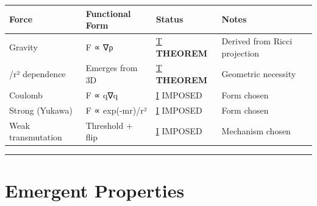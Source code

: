 \documentclass[
  11pt,
  letterpaper,
  twoside,
  openright]{book}
\begin{document}
\begin{longtable}[]{@{}
  >{\raggedright\arraybackslash}p{}
  >{\raggedright\arraybackslash}p{}
  >{\raggedright\arraybackslash}p{}
  >{\raggedright\arraybackslash}p{}@{}}
\toprule\noalign{}
\begin{minipage}[b]{\linewidth}\raggedright
Force
\end{minipage} & \begin{minipage}[b]{\linewidth}\raggedright
Functional Form
\end{minipage} & \begin{minipage}[b]{\linewidth}\raggedright
Status
\end{minipage} & \begin{minipage}[b]{\linewidth}\raggedright
Notes
\end{minipage} \\
\midrule\noalign{}
\endhead
\bottomrule\noalign{}
\endlastfoot
Gravity & F ∝ ∇ρ & \hyperref[t]{T} \textbf{THEOREM} & Derived from Ricci
projection \\
1/r² dependence & Emerges from 3D & \hyperref[t]{T} \textbf{THEOREM} &
Geometric necessity \\
Coulomb & F ∝ q∇q & \hyperref[i]{I} IMPOSED & Form chosen \\
Strong (Yukawa) & F ∝ exp(-mr)/r² & \hyperref[i]{I} IMPOSED & Form
chosen \\
Weak transmutation & Threshold + flip & \hyperref[i]{I} IMPOSED &
Mechanism chosen \\
\end{longtable}

\begin{center}\rule{0.5\linewidth}{0.5pt}\end{center}

\section{Emergent Properties}\label{emergent-properties}
\end{document}
